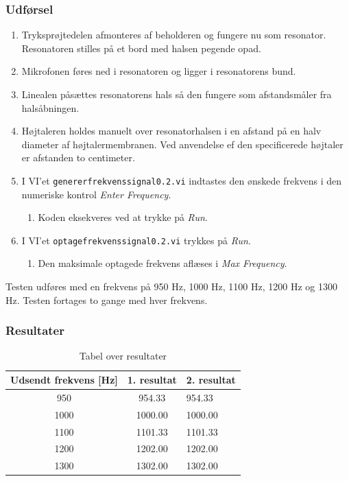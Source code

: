 {		\subsubsection{Udførsel}
			
			\begin{enumerate}
				\item Tryksprøjtedelen afmonteres af beholderen og fungere nu som resonator. Resonatoren stilles på et bord med halsen pegende opad. 
				\item Mikrofonen føres ned i resonatoren og ligger i resonatorens bund. 
				\item Linealen påsættes resonatorens hals så den fungere som afstandsmåler fra halsåbningen.
				\item Højtaleren holdes manuelt over resonatorhalsen i en afstand på en halv diameter af højtalermembranen. Ved anvendelse ef den specificerede højtaler er afstanden to centimeter. 
				\item I VI'et \texttt{genererfrekvenssignal0.2.vi} indtastes den ønskede frekvens i den numeriske kontrol \textit{Enter Frequency}. 
					\begin{enumerate}
						\item Koden eksekveres ved at trykke på \textit{Run}. 
					\end{enumerate} 
				\item I VI'et \texttt{optagefrekvenssignal0.2.vi} trykkes på \textit{Run}. 
					\begin{enumerate}
						\item Den maksimale optagede frekvens aflæses i \textit{Max Frequency}. 
					\end{enumerate}	 	
			\end{enumerate}
			
			Testen udføres med en frekvens på 950 Hz, 1000 Hz, 1100 Hz, 1200 Hz og 1300 Hz. Testen fortages to gange med hver frekvens.  
			
			\subsubsection{Resultater}
			
			\begin{table}[]
				\centering
				\caption{Tabel over resultater}
				\label{bordtest5resultater}
				\begin{tabular}{lll}
					\multicolumn{1}{l|}{\textbf{Udsendt frekvens {[}Hz{]}}} & 	
					\multicolumn{1}{l|}{\textbf{1. resultat}} & \textbf{2. resultat} \\ \hline
					\multicolumn{1}{c|}{950}& 
					\multicolumn{1}{c|}{954.33}&954.33\\
					\multicolumn{1}{c|}{1000}& 
					\multicolumn{1}{c|}{1000.00}&1000.00\\
					\multicolumn{1}{c|}{1100}& 
					\multicolumn{1}{c|}{1101.33}&1101.33\\
					\multicolumn{1}{c|}{1200}& 
					\multicolumn{1}{c|}{1202.00}&1202.00\\
					\multicolumn{1}{c|}{1300}& 
					\multicolumn{1}{c|}{1302.00}&1302.00\\
                   

\end{tabular}
\end{table}}
